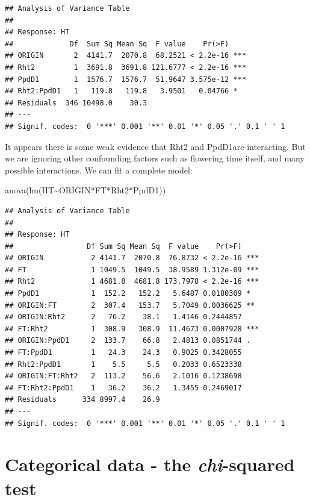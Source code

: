 \documentclass[
]{book}
\newenvironment{Shaded}{\begin{snugshade}}{\end{snugshade}}
\newcommand{\FunctionTok}[1]{\textcolor[rgb]{0.00,0.00,0.00}{#1}}
\newcommand{\NormalTok}[1]{#1}
\newcommand{\SpecialCharTok}[1]{\textcolor[rgb]{0.00,0.00,0.00}{#1}}
\begin{document}
\begin{verbatim}
## Analysis of Variance Table
## 
## Response: HT
##             Df  Sum Sq Mean Sq  F value    Pr(>F)    
## ORIGIN       2  4141.7  2070.8  68.2521 < 2.2e-16 ***
## Rht2         1  3691.8  3691.8 121.6777 < 2.2e-16 ***
## PpdD1        1  1576.7  1576.7  51.9647 3.575e-12 ***
## Rht2:PpdD1   1   119.8   119.8   3.9501   0.04766 *  
## Residuals  346 10498.0    30.3                       
## ---
## Signif. codes:  0 '***' 0.001 '**' 0.01 '*' 0.05 '.' 0.1 ' ' 1
\end{verbatim}

It appears there is some weak evidence that Rht2 and PpdD1are interacting. But we are ignoring other confounding factors such as flowering time itself, and many possible interactions. We can fit a complete model:

\begin{Shaded}
\begin{Highlighting}[]
\FunctionTok{anova}\NormalTok{(}\FunctionTok{lm}\NormalTok{(HT}\SpecialCharTok{\textasciitilde{}}\NormalTok{ORIGIN}\SpecialCharTok{*}\NormalTok{FT}\SpecialCharTok{*}\NormalTok{Rht2}\SpecialCharTok{*}\NormalTok{PpdD1))}
\end{Highlighting}
\end{Shaded}

\begin{verbatim}
## Analysis of Variance Table
## 
## Response: HT
##                 Df Sum Sq Mean Sq  F value    Pr(>F)    
## ORIGIN           2 4141.7  2070.8  76.8732 < 2.2e-16 ***
## FT               1 1049.5  1049.5  38.9589 1.312e-09 ***
## Rht2             1 4681.8  4681.8 173.7978 < 2.2e-16 ***
## PpdD1            1  152.2   152.2   5.6487 0.0180309 *  
## ORIGIN:FT        2  307.4   153.7   5.7049 0.0036625 ** 
## ORIGIN:Rht2      2   76.2    38.1   1.4146 0.2444857    
## FT:Rht2          1  308.9   308.9  11.4673 0.0007928 ***
## ORIGIN:PpdD1     2  133.7    66.8   2.4813 0.0851744 .  
## FT:PpdD1         1   24.3    24.3   0.9025 0.3428055    
## Rht2:PpdD1       1    5.5     5.5   0.2033 0.6523338    
## ORIGIN:FT:Rht2   2  113.2    56.6   2.1016 0.1238698    
## FT:Rht2:PpdD1    1   36.2    36.2   1.3455 0.2469017    
## Residuals      334 8997.4    26.9                       
## ---
## Signif. codes:  0 '***' 0.001 '**' 0.01 '*' 0.05 '.' 0.1 ' ' 1
\end{verbatim}

\hypertarget{categorical-data---the-chi-squared-test}{%
\section{\texorpdfstring{Categorical data - the \emph{chi}-squared test}{Categorical data - the chi-squared test}}\label{categorical-data---the-chi-squared-test}}
\end{document}
